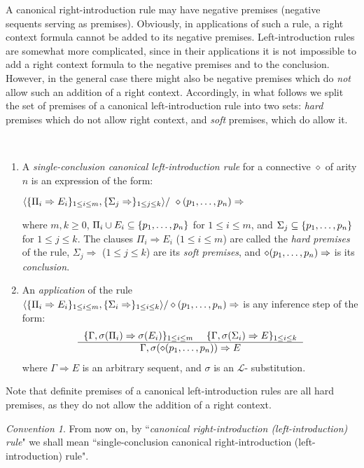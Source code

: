 \documentclass{LMCS}
\theoremstyle{remark}
\newtheorem*{convention}{Convention}
\newcommand{\lp}{\mathcal{L}}
\newcommand{\dd}{\diamond}
\newcommand{\ptil}{p_1 \til p_n}
\newcommand{\be}{\begin{enumerate}[(1)]}
\newcommand{\ee}{\end{enumerate}}
\newcommand{\Ra}{\Rightarrow}
\newcommand{\g}{\Gamma}
\newcommand{\tup}[1]{\langle #1 \rangle}
\newcommand{\suq}{\subseteq}
\newcommand{\derb}[3]{
    \begin{tabular}{c}
    $ #1 \ \ \ \ #2 $ \\ \hline
    $ #3 $ \\
    \end{tabular}}
\begin{document}
A canonical right-introduction rule may have negative premises 
(negative sequents serving as premises).
Obviously, in applications of such a rule, a right 
context formula cannot be added
to its negative premises. Left-introduction rules are somewhat more complicated, since
in their applications it is not impossible to add a right context formula to 
the negative premises and to the conclusion. However,
in the general case there might also be negative premises 
which do {\em not} allow such an  addition of  a right context.
Accordingly, in what follows we split the set of premises
of a canonical left-introduction rule into two sets: {\em hard} premises 
which do not allow right context, 
and {\em soft} premises, which do allow it.


\sloppy

\begin{defi}
\label{canonical left-introduction rule}
\
\be
\item
A {\em  single-conclusion canonical left-introduction rule} for a connective $\diamond$ of arity $n$
is an expression of the form:
\begin{center}
${\tup{\{\Pi_i \Ra E_i\}_{1 \leq i \leq m},\{\Sigma_j \Ra \}_{1 \leq j \leq k}} / \ \dd(\ptil)\Ra}$
\end{center}
where $m,k\geq 0$, $\Pi_i\cup E_i\suq\{\ptil\}$ for $1 \leq i \leq m$, 
and $\Sigma_j\suq\{\ptil\}$  for $1 \leq j \leq k$. The clauses
$\Pi_i \Ra E_i$ ($1 \leq i \leq m$) are called the {\em hard premises}
of the rule, 
 $\Sigma_j \Ra$ ($1 \leq j \leq k$)  are its {\em soft premises}, 
and $\dd(\ptil) \Ra$ is its {\em conclusion}.
\item An {\em application} of the rule
\\ $\tup{\{\Pi_i \Ra E_i\}_{1 \leq i \leq m},\{\Sigma_i \Ra \}_{1 \leq i \leq k}} / \dd(\ptil)\Ra$
is any inference step of the form:
\[\derb{\{\g,\sigma(\Pi_i) \Ra \sigma(E_i)\}_{1 \leq i \leq m}}
 {\{\g,\sigma(\Sigma_i) \Ra E\}_{1 \leq i \leq k}}
 {\g, \sigma(\dd(\ptil))\Ra E}\]
where $\g\Ra E$ is an arbitrary sequent, and $\sigma$ is an $\lp$- substitution.
\ee
\end{defi}

\fussy

\begin{rem}
Note that definite premises of a canonical left-introduction rules 
are all hard premises, as they do not allow the addition of a right context.
\end{rem}

\begin{convention}
From now on, by  ``{\em canonical right-introduction (left-introduction) rule}" 
we shall mean ``single-conclusion canonical right-introduction (left-introduction) rule".
\end{convention}
\end{document}

